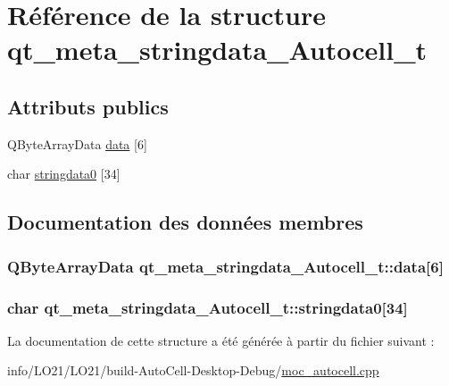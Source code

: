 \hypertarget{structqt__meta__stringdata___autocell__t}{}\section{Référence de la structure qt\+\_\+meta\+\_\+stringdata\+\_\+\+Autocell\+\_\+t}
\label{structqt__meta__stringdata___autocell__t}
\subsection*{Attributs publics}
\begin{DoxyCompactItemize}
\item 
Q\+Byte\+Array\+Data \hyperlink{structqt__meta__stringdata___autocell__t_ab2d545bf60d06da38f2e04f582a880ae}{data} \mbox{[}6\mbox{]}
\item 
char \hyperlink{structqt__meta__stringdata___autocell__t_aacd0730b3ef21589a31099e0bffbec58}{stringdata0} \mbox{[}34\mbox{]}
\end{DoxyCompactItemize}


\subsection{Documentation des données membres}
\subsubsection[{\texorpdfstring{data}{data}}]{\setlength{\rightskip}{0pt plus 5cm}Q\+Byte\+Array\+Data qt\+\_\+meta\+\_\+stringdata\+\_\+\+Autocell\+\_\+t\+::data\mbox{[}6\mbox{]}}\hypertarget{structqt__meta__stringdata___autocell__t_ab2d545bf60d06da38f2e04f582a880ae}{}\label{structqt__meta__stringdata___autocell__t_ab2d545bf60d06da38f2e04f582a880ae}
\subsubsection[{\texorpdfstring{stringdata0}{stringdata0}}]{\setlength{\rightskip}{0pt plus 5cm}char qt\+\_\+meta\+\_\+stringdata\+\_\+\+Autocell\+\_\+t\+::stringdata0\mbox{[}34\mbox{]}}\hypertarget{structqt__meta__stringdata___autocell__t_aacd0730b3ef21589a31099e0bffbec58}{}\label{structqt__meta__stringdata___autocell__t_aacd0730b3ef21589a31099e0bffbec58}


La documentation de cette structure a été générée à partir du fichier suivant \+:\begin{DoxyCompactItemize}
\item 
info/\+L\+O21/\+L\+O21/build-\/\+Auto\+Cell-\/\+Desktop-\/\+Debug/\hyperlink{moc__autocell_8cpp}{moc\+\_\+autocell.\+cpp}\end{DoxyCompactItemize}
